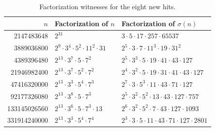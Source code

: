 \documentclass[11pt]{article}
\theoremstyle{definition}
\theoremstyle{remark}
\begin{document}
\scriptsize
\begin{table}[ht]
\centering
\begin{tabular}{r>{\raggedright\arraybackslash}p{}
>{\raggedright\arraybackslash}p{}}
\toprule
\(n\) & Factorization of \(n\) & Factorization of \(\sigma(n)\)\\
\midrule
2147483648 &
\(2^{31}\) &
\(3\cdot 5\cdot 17\cdot 257\cdot 65537\)\\
3889036800 &
\(2^9\cdot 3^4\cdot 5^2\cdot 11^2\cdot 31\) &
\(2^5\cdot 3\cdot 7\cdot 11^3\cdot 19\cdot 31^2\)\\
4389396480 &
\(2^{13}\cdot 3^7\cdot 5\cdot 7^2\) &
\(2^5\cdot 3^3\cdot 5\cdot 19\cdot 41\cdot 43\cdot 127\)\\
21946982400 &
\(2^{13}\cdot 3^7\cdot 5^2\cdot 7^2\) &
\(2^4\cdot 3^2\cdot 5\cdot 19\cdot 31\cdot 41\cdot 43\cdot 127\)\\
47416320000 &
\(2^{13}\cdot 3^3\cdot 5^4\cdot 7^3\) &
\(2^7\cdot 3\cdot 5^3\cdot 11\cdot 43\cdot 71\cdot 127\)\\
92177326080 &
\(2^{13}\cdot 3^8\cdot 5\cdot 7^3\) &
\(2^5\cdot 3^2\cdot 5^2\cdot 13\cdot 43\cdot 127\cdot 757\)\\
133145026560 &
\(2^{13}\cdot 3^6\cdot 5\cdot 7^3\cdot 13\) &
\(2^6\cdot 3^2\cdot 5^2\cdot 7\cdot 43\cdot 127\cdot 1093\)\\
331914240000 &
\(2^{13}\cdot 3^3\cdot 5^4\cdot 7^4\) &
\(2^3\cdot 3\cdot 5\cdot 11\cdot 43\cdot 71\cdot 127\cdot 2801\)\\
\bottomrule
\end{tabular}
\caption{Factorization witnesses for the eight new hits.}
\label{tab:factors}
\end{table}
\normalsize

\clearpage
\end{document}
